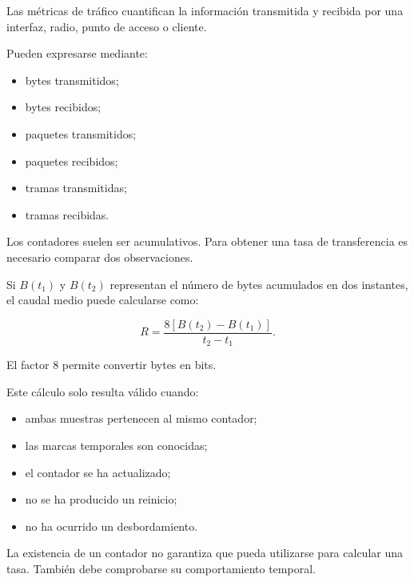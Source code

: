 Las métricas de tráfico cuantifican la información transmitida y recibida
por una interfaz, radio, punto de acceso o cliente.

Pueden expresarse mediante:

\begin{itemize}
    \item bytes transmitidos;

    \item bytes recibidos;

    \item paquetes transmitidos;

    \item paquetes recibidos;

    \item tramas transmitidas;

    \item tramas recibidas.
\end{itemize}

Los contadores suelen ser acumulativos. Para obtener una tasa de
transferencia es necesario comparar dos observaciones.

Si \(B(t_1)\) y \(B(t_2)\) representan el número de bytes acumulados en
dos instantes, el caudal medio puede calcularse como:

\[
    R =
    \frac{
        8
        \left[
            B(t_2)-B(t_1)
        \right]
    }{
        t_2-t_1
    }.
\]

El factor \(8\) permite convertir bytes en bits.

Este cálculo solo resulta válido cuando:

\begin{itemize}
    \item ambas muestras pertenecen al mismo contador;

    \item las marcas temporales son conocidas;

    \item el contador se ha actualizado;

    \item no se ha producido un reinicio;

    \item no ha ocurrido un desbordamiento.
\end{itemize}

La existencia de un contador no garantiza que pueda utilizarse para
calcular una tasa. También debe comprobarse su comportamiento temporal.


